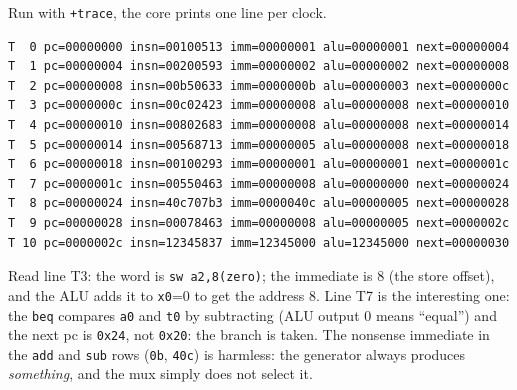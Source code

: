 \begin{example}\label{ex:trace05}
Run with \texttt{+trace}, the core prints one line per clock.
\begin{lstlisting}
T  0 pc=00000000 insn=00100513 imm=00000001 alu=00000001 next=00000004
T  1 pc=00000004 insn=00200593 imm=00000002 alu=00000002 next=00000008
T  2 pc=00000008 insn=00b50633 imm=0000000b alu=00000003 next=0000000c
T  3 pc=0000000c insn=00c02423 imm=00000008 alu=00000008 next=00000010
T  4 pc=00000010 insn=00802683 imm=00000008 alu=00000008 next=00000014
T  5 pc=00000014 insn=00568713 imm=00000005 alu=00000008 next=00000018
T  6 pc=00000018 insn=00100293 imm=00000001 alu=00000001 next=0000001c
T  7 pc=0000001c insn=00550463 imm=00000008 alu=00000000 next=00000024
T  8 pc=00000024 insn=40c707b3 imm=0000040c alu=00000005 next=00000028
T  9 pc=00000028 insn=00078463 imm=00000008 alu=00000005 next=0000002c
T 10 pc=0000002c insn=12345837 imm=12345000 alu=12345000 next=00000030
\end{lstlisting}
Read line T3: the word is \texttt{sw a2,8(zero)}; the immediate is 8
(the store offset), and the ALU adds it to \texttt{x0}=0 to get the
address 8. Line T7 is the interesting one: the \texttt{beq} compares
\texttt{a0} and \texttt{t0} by subtracting (ALU output 0 means ``equal'')
and the next pc is \texttt{0x24}, not \texttt{0x20}: the branch is
taken. The nonsense immediate in the \texttt{add} and \texttt{sub} rows
(\texttt{0b}, \texttt{40c}) is harmless: the generator always produces
\emph{something}, and the mux simply does not select it.
\end{example}

